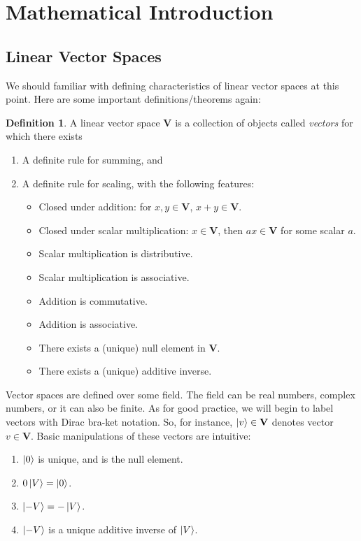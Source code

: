 \documentclass{book}
\theoremstyle{definition}
\newtheorem{defn}{Definition}[section]
\newcommand{\V}{\mathbf{V}}
\begin{document}
\newpage


\section{Mathematical Introduction}

\subsection{Linear Vector Spaces}

We should familiar with defining characteristics of linear vector spaces at this point. Here are some important definitions/theorems again:

\begin{defn}
	A linear vector space $\textbf{V}$ is a collection of objects called \textit{vectors} for which there exists
	
	\begin{enumerate}
		\item A definite rule for summing, and
		\item A definite rule for scaling, with the following features:
		
		
		\begin{itemize}
			\item Closed under addition: for $x,y \in \V$, $x+y \in \V$.
			\item Closed under scalar multiplication: $x\in \V$, then $ax \in \V$ for some scalar $a$.
			\item Scalar multiplication is distributive. 
			\item Scalar multiplication is associative.
			\item Addition is commutative.
			\item Addition is associative.
			\item There exists a (unique) null element in $\V$.
			\item There exists a (unique) additive inverse. 
		\end{itemize}
	\end{enumerate}
\end{defn}


Vector spaces are defined over some field. The field can be real numbers, complex numbers, or it can also be finite. As for good practice, we will begin to label vectors with Dirac bra-ket notation. So, for instance, $\ket{v} \in \V$ denotes vector $v \in \V$. Basic manipulations of these vectors are intuitive:
\begin{enumerate}
	\item $\ket{0}$ is unique, and is the null element.
	\item $0\ket{V} = \ket{0}$.
	\item $\ket{-V} = -\ket{V}$.
	\item $\ket{-V}$ is a unique additive inverse of $\ket{V}$.
\end{enumerate} 
\end{document}
